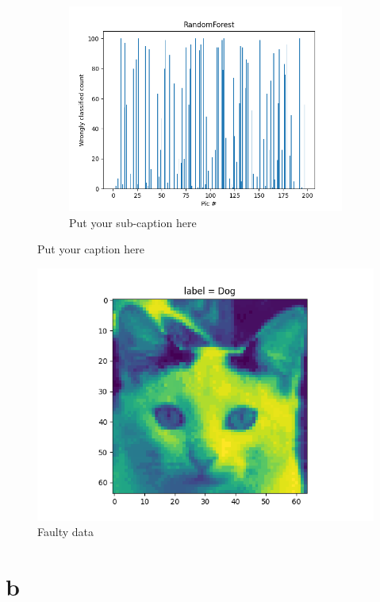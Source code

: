 \documentclass{article}
\begin{document}
\begin{figure}[ht]
\begin{subfigure}{.33\textwidth}
  \includegraphics[width=1\linewidth]{1a/Random Forest.png}  
  \caption{Put your sub-caption here}
  \label{fig:sub-second}
\end{subfigure}
\caption{Put your caption here}
\label{wrong}
\end{figure}
\begin{figure}[H]
    \centering
    \includegraphics[scale=0.5]{1a/Dirty data.png}
    \caption{Faulty data}
    \label{faulty data}
\end{figure}
\newpage
\section{b}
\end{document}
